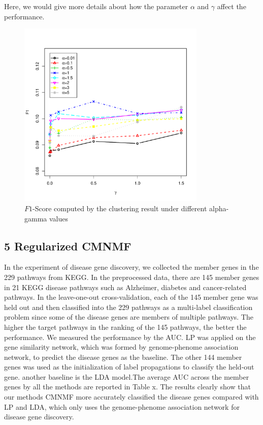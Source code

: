 \documentclass{bmcart}
\begin{document}
Here, we would give more details about how the parameter $\alpha$ and $\gamma$ affect the performance.
\begin{figure}[!h]
  \centering
 \includegraphics[width=0.8\textwidth]{DrawPictures/alpha-gamma.pdf}
  \caption{$F1$-Score computed by the clustering result under different alpha-gamma values }\label{fig:F1-alpha-gamma}
\end{figure}

\subsection*{5 Regularized CMNMF}
In the experiment of disease gene discovery, we collected the member genes in the 229 pathways from KEGG. In the preprocessed data, there are 145 member genes in 21 KEGG disease pathways such as Alzheimer, diabetes and cancer-related pathways. In the leave-one-out cross-validation, each of the 145 member gene was held out and then classified into the 229 pathways as a multi-label classification problem since some of the disease genes are
members of multiple pathways. The higher the target pathways in the ranking of the 145 pathways, the better the performance. We measured the performance by the AUC. LP was applied on the gene similarity network, which was formed by genome-phenome association network, to predict the disease genes as the baseline. The other 144 member genes was used as the initialization of label propagations to classify the held-out gene. another baseline is the LDA model.The average AUC across the  member genes by all the methods are reported in Table x. The results clearly show that our methods CMNMF more accurately classified the disease genes compared with LP and LDA, which only uses the genome-phenome association network for disease gene discovery.
\end{document}
